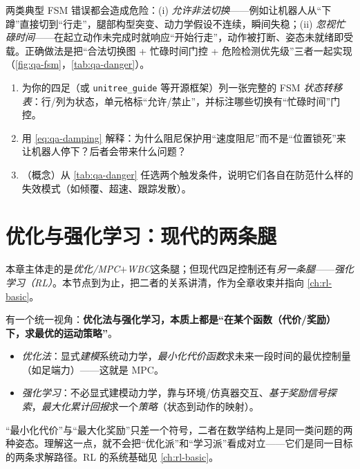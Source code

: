 \begin{pitfall}[误区：忽视忙碌时间或允许非法切换]
两类典型 FSM 错误都会造成危险：(i) \emph{允许非法切换}——例如让机器人从“下蹲”直接切到“行走”，腿部构型突变、动力学假设不连续，瞬间失稳；(ii) \emph{忽视忙碌时间}——在起立动作未完成时就响应“开始行走”，动作被打断、姿态未就绪即受载。正确做法是把“合法切换图 + 忙碌时间门控 + 危险检测优先级”三者一起实现（\cref{fig:qa-fsm}，\cref{tab:qa-danger}）。
\end{pitfall}

\begin{practice}
\begin{enumerate}
  \item 为你的四足（或 \texttt{unitree\_guide} 等开源框架）列一张完整的 FSM \emph{状态转移表}：行/列为状态，单元格标“允许/禁止”，并标注哪些切换有“忙碌时间”门控。
  \item 用 \cref{eq:qa-damping} 解释：为什么阻尼保护用“速度阻尼”而不是“位置锁死”来让机器人停下？后者会带来什么问题？
  \item （概念）从 \cref{tab:qa-danger} 任选两个触发条件，说明它们各自在防范什么样的失效模式（如倾覆、超速、跟踪发散）。
\end{enumerate}
\end{practice}

\section{优化与强化学习：现代的两条腿}
\label{sec:qa-two-streams}

本章主体走的是\emph{优化/MPC$+$WBC}这条腿；但现代四足控制还有\emph{另一条腿}——\emph{强化学习（RL）}。本节点到为止，把二者的关系讲清，作为全章收束并指向 \cref{ch:rl-basic}。

\begin{insight}\label{ins:qa-two-streams}
有一个统一视角：\textbf{优化法与强化学习，本质上都是“在某个函数（代价/奖励）下，求最优的运动策略”}。
\begin{itemize}
  \item \emph{优化法}：显式\emph{建模}系统动力学，\emph{最小化代价函数}求未来一段时间的最优控制量（如足端力）——这就是 MPC。
  \item \emph{强化学习}：不必显式建模动力学，靠与环境/仿真器交互、\emph{基于奖励信号探索}，\emph{最大化累计回报}求一个\emph{策略}（状态到动作的映射）。
\end{itemize}
“最小化代价”与“最大化奖励”只差一个符号，二者在数学结构上是同一类问题的两种姿态\cite{yu2021quadruped}。理解这一点，就不会把“优化派”和“学习派”看成对立——它们是同一目标的两条求解路径。RL 的系统基础见 \cref{ch:rl-basic}。
\end{insight}

